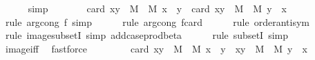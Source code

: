 \begin{isabellebody}
\ \ \ \ \isamarkupfalse%
\ simp\isanewline
\ \ \isamarkupfalse%
\ \isamarkupfalse%
\ {\isachardoublequoteopen}{\isachardot}{\kern0pt}{\isachardot}{\kern0pt}{\isachardot}{\kern0pt}\ {\isacharequal}{\kern0pt}\ card\ {\isacharbraceleft}{\kern0pt}{\isacharparenleft}{\kern0pt}x{\isacharcomma}{\kern0pt}y{\isacharparenright}{\kern0pt}\ {\isasymin}\ M\ {\isasymtimes}\ M{\isachardot}{\kern0pt}\ x\ {\isacharless}{\kern0pt}\ y{\isacharbraceright}{\kern0pt}\ {\isacharplus}{\kern0pt}\ card\ {\isacharbraceleft}{\kern0pt}{\isacharparenleft}{\kern0pt}x{\isacharcomma}{\kern0pt}y{\isacharparenright}{\kern0pt}\ {\isasymin}\ M\ {\isasymtimes}\ M{\isachardot}{\kern0pt}\ y\ {\isacharless}{\kern0pt}\ x{\isacharbraceright}{\kern0pt}{\isachardoublequoteclose}\isanewline
\ \ \ \ \isamarkupfalse%
\ {\isacharparenleft}{\kern0pt}rule\ arg{\isacharunderscore}{\kern0pt}cong{}{\isacharbrackleft}{\kern0pt}\ f{\isacharequal}{\kern0pt}{\isachardoublequoteopen}{\isacharparenleft}{\kern0pt}{\isacharplus}{\kern0pt}{\isacharparenright}{\kern0pt}{\isachardoublequoteclose}{\isacharbrackright}{\kern0pt}{\isacharcomma}{\kern0pt}\ simp{\isacharparenright}{\kern0pt}\isanewline
\ \ \ \ \isamarkupfalse%
\ {\isacharparenleft}{\kern0pt}rule\ arg{\isacharunderscore}{\kern0pt}cong{\isacharbrackleft}{\kern0pt}\ f{\isacharequal}{\kern0pt}{\isachardoublequoteopen}card{\isachardoublequoteclose}{\isacharbrackright}{\kern0pt}{\isacharparenright}{\kern0pt}\isanewline
\ \ \ \ \isamarkupfalse%
\ {\isacharparenleft}{\kern0pt}rule\ order{\isacharunderscore}{\kern0pt}antisym{\isacharparenright}{\kern0pt}\isanewline
\ \ \ \ \ \isamarkupfalse%
\ {\isacharparenleft}{\kern0pt}rule\ image{\isacharunderscore}{\kern0pt}subsetI{\isacharcomma}{\kern0pt}\ simp\ add{\isacharcolon}{\kern0pt}case{\isacharunderscore}{\kern0pt}prod{\isacharunderscore}{\kern0pt}beta{\isacharparenright}{\kern0pt}\isanewline
\ \ \ \ \isamarkupfalse%
\ {\isacharparenleft}{\kern0pt}rule\ subsetI{\isacharcomma}{\kern0pt}\ simp{\isacharparenright}{\kern0pt}\ \isanewline
\ \ \ \ \isamarkupfalse%
\ image{\isacharunderscore}{\kern0pt}iff\ \isamarkupfalse%
\ fastforce\ \isanewline
\ \ \isamarkupfalse%
\ \isamarkupfalse%
\ {\isachardoublequoteopen}{\isachardot}{\kern0pt}{\isachardot}{\kern0pt}{\isachardot}{\kern0pt}\ {\isacharequal}{\kern0pt}\ card\ {\isacharparenleft}{\kern0pt}{\isacharbraceleft}{\kern0pt}{\isacharparenleft}{\kern0pt}x{\isacharcomma}{\kern0pt}y{\isacharparenright}{\kern0pt}\ {\isasymin}\ M\ {\isasymtimes}\ M{\isachardot}{\kern0pt}\ x\ {\isacharless}{\kern0pt}\ y{\isacharbraceright}{\kern0pt}\ {\isasymunion}\ {\isacharbraceleft}{\kern0pt}{\isacharparenleft}{\kern0pt}x{\isacharcomma}{\kern0pt}y{\isacharparenright}{\kern0pt}\ {\isasymin}\ M\ {\isasymtimes}\ M{\isachardot}{\kern0pt}\ y\ {\isacharless}{\kern0pt}\ x{\isacharbraceright}{\kern0pt}{\isacharparenright}{\kern0pt}{\isachardoublequoteclose}\isanewline

\end{isabellebody}
